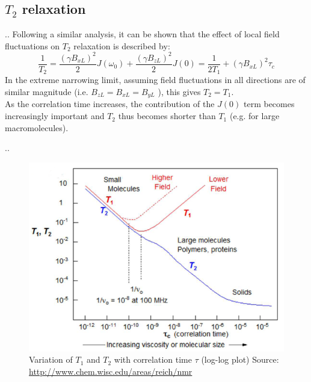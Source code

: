 \documentclass[handout]{beamer}
\begin{document}
\subsection{$T_2$ relaxation}
\begin{frame}{\thesection.\thesubsection. \insertsubsection}
	Following a similar analysis, it can be shown that the effect of local field fluctuations on $T_2$ relaxation is described by:
	\begin{equation} \label{eq: T2_relax}
	\dfrac{1}{T_2} = \dfrac{(\gamma B_{xL})^2}{2} J(\omega_0) + \dfrac{(\gamma B_{zL})^2}{2} J(0) = \dfrac{1}{2 T_1} + (\gamma B_{xL})^2 \tau_c
	\end{equation}
	In the extreme narrowing limit, assuming field fluctuations in all directions are of similar magnitude (i.e. $B_{zL} = B_{xL} = B_{yL}$ ), this gives $T_2 = T_1$. \\
	As the correlation time increases, the contribution of the $J(0)$ term becomes increasingly important and $T_2$ thus becomes shorter than $T_1$ (e.g. for large macromolecules).
\end{frame}

\begin{frame}{\thesection.\thesubsection. \insertsubsection}
   \begin{figure}
   	  \centering
   	  \includegraphics[scale=0.4]{figures/T1_T2_vs_tc.png}
   	  \caption{Variation of $T_1$ and $T_2$ with correlation time $\tau$ (log-log plot) Source: \url{http://www.chem.wisc.edu/areas/reich/nmr}
      }
   \end{figure}
\end{frame}
\end{document}

